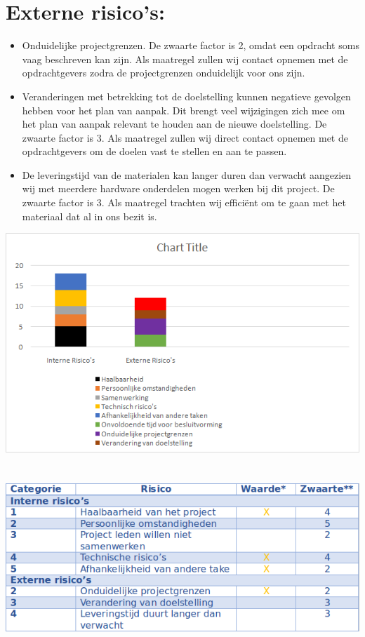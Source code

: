 \documentclass[oneside]{book}
\begin{document}
\section*{Externe risico's:}
\begin{itemize}
	\item Onduidelijke projectgrenzen. De zwaarte factor is 2, omdat een opdracht soms vaag 
    beschreven kan zijn. Als maatregel zullen wij contact opnemen met de opdrachtgevers zodra 
    de projectgrenzen onduidelijk voor ons zijn.

	\item Veranderingen met betrekking tot de doelstelling kunnen negatieve gevolgen hebben voor  
    het plan van aanpak. Dit brengt veel wijzigingen zich mee om het plan van aanpak relevant te   
    houden aan de nieuwe doelstelling. De zwaarte factor is 3. Als maatregel zullen wij direct  
    contact  opnemen met de opdrachtgevers om de doelen vast te stellen en aan te passen.

	\item De leveringstijd van de materialen kan langer duren dan verwacht aangezien wij met 
    meerdere hardware onderdelen mogen werken bij dit project.  De zwaarte factor is 3. Als
    maatregel trachten wij efficiënt om te gaan met het materiaal dat al in ons bezit is.    
\end{itemize} 
\clearpage
\includegraphics[scale=0.80]{image/graph.png}
\\
\\
\\
\includegraphics[scale=0.75]{image/table.png}
\end{document}
